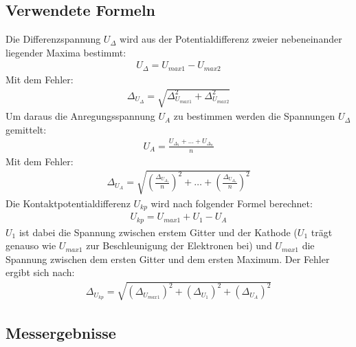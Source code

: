 \documentclass[12pt,a4paper]{article}
\begin{document}
\subsection{Verwendete Formeln}
Die Differenzspannung $U_{\Delta}$ wird aus der Potentialdifferenz zweier nebeneinander liegender Maxima bestimmt:
\begin{align}
U_{\Delta} = U_{max1}-U_{max2}
\label{eqn:u_d}
\end{align}
Mit dem Fehler:
\begin{align}
\Delta_{U_{\Delta}} = \sqrt{\Delta_{U_{max1}}^2+\Delta_{U_{max2}}^2}
\label{eqn:u_d_delta}
\end{align}
Um daraus die Anregungsspannung $U_A$ zu bestimmen werden die Spannungen $U_{\Delta}$ gemittelt:
\begin{align}
U_A = \frac{U_{\Delta_1}+\ldots+U_{\Delta_n}}{n}
\label{eqn:u_a}
\end{align}
Mit dem Fehler:
\begin{align}
\Delta_{U_A} = \sqrt{
\left(\frac{\Delta_{U_{\Delta_1}}}{n}\right)^2+
\ldots+
\left(\frac{\Delta_{U_{\Delta_n}}}{n}\right)^2}
\label{eqn:u_a_delta}
\end{align}
Die Kontaktpotentialdifferenz $U_{kp}$ wird nach folgender Formel berechnet:
\begin{align}
U_{kp} = U_{max1} + U_1 - U_A
\label{eqn:kp}
\end{align}
$U_1$ ist dabei die Spannung zwischen erstem Gitter und der Kathode ($U_1$ trägt genauso wie $U_{max1}$ zur Beschleunigung der Elektronen bei) und $U_{max1}$ die Spannung zwischen dem ersten Gitter und dem ersten Maximum.
Der Fehler ergibt sich nach:
\begin{align}
\Delta_{U_{kp}} = \sqrt{
\left(\Delta_{U_{max1}}\right)^2+
\left(\Delta_{U_1}\right)^2+
\left(\Delta_{U_A}\right)^2}
\label{eqn:kp_delta}
\end{align}
\subsection{Messergebnisse}
\end{document}
